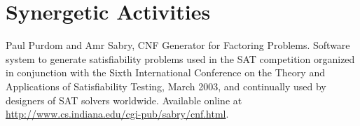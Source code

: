 \documentclass[11pt]{article}
\begin{document}
\begin{refsection}
\nocite{DQT2014, geometry2013, VDS2009, AGVS2005, VAS2006}
\printbibliography[title={Closely Related Publications}]
\end{refsection}

\begin{refsection}
\nocite{CaretteSabry2016, JamesSabry2012, Sabry2009, MoggiSabry2001, FSDF1993}
\printbibliography[title={Other Significant Publications}]
\end{refsection}

\section*{Synergetic Activities}

Paul Purdom and Amr Sabry, CNF Generator for Factoring Problems.  Software
system to generate satisfiability problems used in the SAT competition
organized in conjunction with the Sixth International Conference on the
Theory and Applications of Satisfiability Testing, March 2003, and
continually used by designers of SAT solvers worldwide. Available online at
\url{http://www.cs.indiana.edu/cgi-pub/sabry/cnf.html}.
\end{document}
